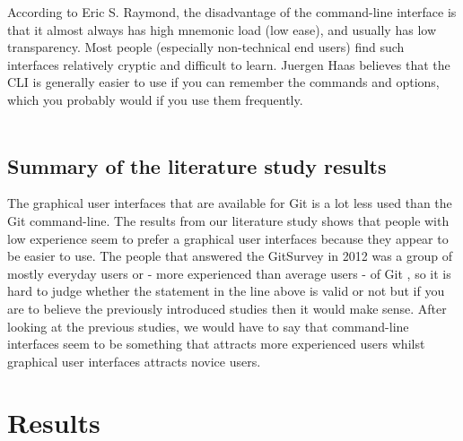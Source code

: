 \documentclass[a4paper,oneside]{bth} %
\begin{document}
			According to Eric S. Raymond\cite{ArtOfUnixProgramming}, the disadvantage of the command-line interface is that it almost always has high mnemonic load (low ease), and usually has low transparency. Most people (especially non-technical end users) find such interfaces relatively cryptic and difficult to learn. \cite{ArtOfUnixProgramming}
			Juergen Haas believes that the CLI is generally easier to use if you can remember the commands and options, which you probably would if you use them frequently. \cite{LinuxGuiVsCli}\\\\
			
			
			\section{Summary of the literature study results}
			The graphical user interfaces that are available for Git is a lot less used than the Git command-line. The results from our literature study shows that people with low experience seem to prefer a graphical user interfaces because they appear to be easier to use. The people that answered the GitSurvey in 2012 was a group of mostly everyday users or - more experienced than average users - of Git \cite{GitUserSurvey}, so it is hard to judge whether the statement in the line above is valid or not but if you are to believe the previously introduced studies then it would make sense. After looking at the previous studies, we would have to say that command-line interfaces seem to be something that attracts more experienced users whilst graphical user interfaces attracts novice users.
			
		
		\chapter{Results}
\end{document}
